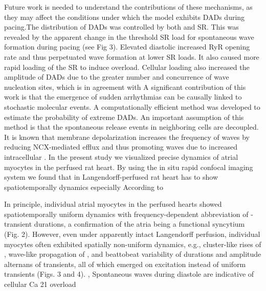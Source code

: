 \documentclass{biophys-new}
\begin{document}
Future work is needed to understand the contributions of these mechanisms, as they may
affect the conditions under which the model exhibits DADs during pacing.The distribution of DADs was controlled by both  and SR. This was revealed
by the apparent change in the threshold SR  load for spontaneous  wave formation
during pacing (see Fig 3). Elevated diastolic  increased RyR opening rate and thus perpetuated  wave formation at lower SR  loads. It also caused more rapid loading of the
SR to induce overload. Cellular  loading also increased the amplitude of DADs due to the
greater number and concurrence of  wave nucleation sites, which is in agreement with
A significant contribution of this work is that the emergence of sudden arrhythmias can be
causally linked to stochastic molecular events. A computationally efficient method was developed to estimate the probability of extreme DADs. An important assumption of this method is that the spontaneous  release events in neighboring cells are decoupled.
It is known that membrane depolarization increases the frequency of  waves by reducing NCX-mediated
 efflux and thus promoting  waves due to increased intracellular  \cite{walker2017estimating}.
In the present study we visualized precise  dynamics of atrial myocytes in the perfused rat heart.
By using the in situ rapid confocal imaging system
we found that in Langendorff-perfused rat heart has to show
spatiotemporally  dynamics especially According to

In principle, individual atrial myocytes in the perfused hearts showed spatiotemporally uniform  dynamics with frequency-dependent abbreviation of -transient durations,
a confirmation of the atria being a functional syncytium (Fig. 2).
However, even under apparently intact Langendorff perfusion,
individual myocytes often exhibited spatially non-uniform  dynamics,
e.g., cluster-like rises of , wave-like propagation of ,
and beattobeat variability of durations and amplitude alternans of  transients,
all of which emerged on excitation instead of uniform  transients (Figs. 3 and 4).
\cite{jiang2014pacing}, \cite{aguirre2014intravital}
Spontaneous  waves during diastole are indicative of cellular Ca 21 overload \cite{macquaide2007measurement}
\end{document}
